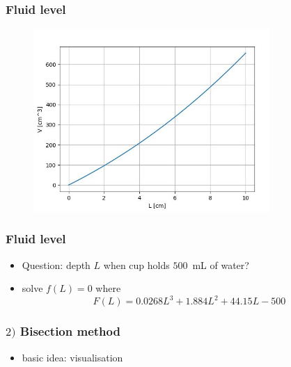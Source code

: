 \documentclass[english,14pt]{beamer}
\begin{document}

\begin{frame}[fragile]

\frametitle{Fluid level}

\begin{figure}[ht]
	\centering
	\includegraphics[width=0.8\textwidth]{figures/fluidVvsL}
\end{figure}

\end{frame}


\begin{frame}[fragile]

\frametitle{Fluid level}

\begin{itemize}

	\item Question: depth $L$ when cup holds $500$~mL of water?
	\item solve $f(L) = 0$ where
	\[
		F(L) = 0.0268L^3 + 1.884L^2 + 44.15L - 500
	\]
\end{itemize}

\end{frame}


\begin{frame}[fragile]

\frametitle{$2)$ Bisection method}

\begin{itemize}
	\item basic idea: visualisation
\end{itemize}

\end{frame}
\end{document}
